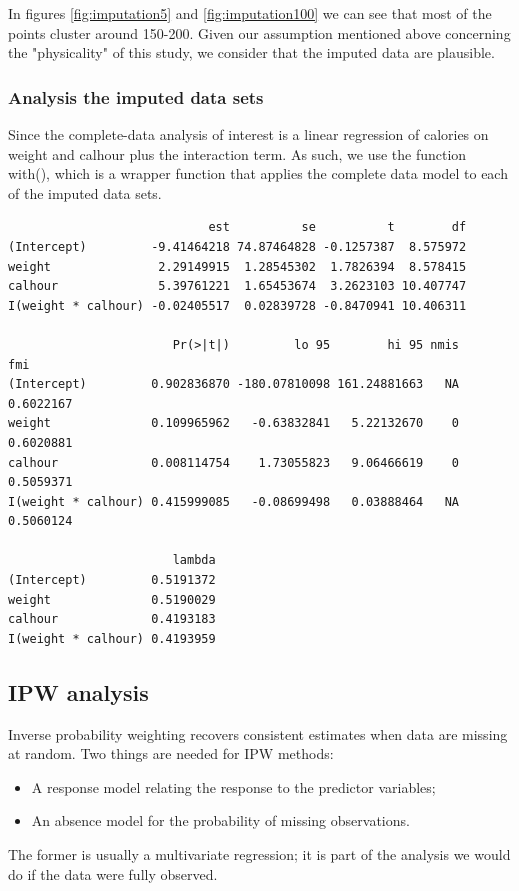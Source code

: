 \documentclass[11pt, a4paper]{article}
\begin{document}
In figures \ref{fig:imputation5} and \ref{fig:imputation100} we can
see that most of the points cluster around 150-200. Given our
assumption mentioned above concerning the "physicality" of this study,
we consider that the imputed data are plausible.

\subsubsection{Analysis the imputed data sets}
Since the complete-data analysis of interest is a linear regression of
calories on weight and calhour plus the interaction term. As such, we
use the function with(), which is a wrapper function that applies the
complete data model to each of the imputed data sets.

\begin{verbatim}
                            est          se          t        df
(Intercept)         -9.41464218 74.87464828 -0.1257387  8.575972
weight               2.29149915  1.28545302  1.7826394  8.578415
calhour              5.39761221  1.65453674  3.2623103 10.407747
I(weight * calhour) -0.02405517  0.02839728 -0.8470941 10.406311

                       Pr(>|t|)         lo 95        hi 95 nmis       fmi
(Intercept)         0.902836870 -180.07810098 161.24881663   NA 0.6022167
weight              0.109965962   -0.63832841   5.22132670    0 0.6020881
calhour             0.008114754    1.73055823   9.06466619    0 0.5059371
I(weight * calhour) 0.415999085   -0.08699498   0.03888464   NA 0.5060124

                       lambda
(Intercept)         0.5191372
weight              0.5190029
calhour             0.4193183
I(weight * calhour) 0.4193959
\end{verbatim}

\subsection{IPW analysis}
Inverse probability weighting recovers consistent estimates when data
are missing at random. Two things are needed for IPW methods:
\begin{itemize}
    \item A response model relating the response to the predictor variables;
    \item An absence model for the probability of missing observations.
\end{itemize}
The former is usually a multivariate regression; it is part of the
analysis we would do if the data were fully observed.
\end{document}
